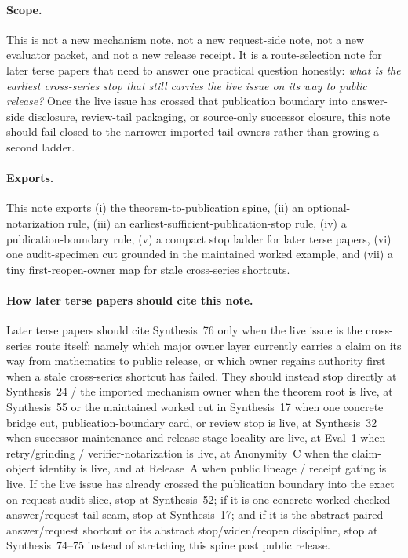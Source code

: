 \documentclass[11pt]{article}
\begin{document}
\paragraph{Scope.}
This is not a new mechanism note, not a new request-side note, not a new evaluator packet, and not a new release receipt.
It is a route-selection note for later terse papers that need to answer one practical question honestly: \emph{what is the earliest cross-series stop that still carries the live issue on its way to public release?} Once the live issue has crossed that publication boundary into answer-side disclosure, review-tail packaging, or source-only successor closure, this note should fail closed to the narrower imported tail owners rather than growing a second ladder.

\paragraph{Exports.}
This note exports (i) the theorem-to-publication spine, (ii) an optional-notarization rule, (iii) an earliest-sufficient-publication-stop rule, (iv) a publication-boundary rule, (v) a compact stop ladder for later terse papers, (vi) one audit-specimen cut grounded in the maintained worked example, and (vii) a tiny first-reopen-owner map for stale cross-series shortcuts.

\paragraph{How later terse papers should cite this note.}
Later terse papers should cite Synthesis~76 only when the live issue is the cross-series route itself: namely which major owner layer currently carries a claim on its way from mathematics to public release, or which owner regains authority first when a stale cross-series shortcut has failed. They should instead stop directly at Synthesis~24 / the imported mechanism owner when the theorem root is live, at Synthesis~55 or the maintained worked cut in Synthesis~17 when one concrete bridge cut, publication-boundary card, or review stop is live, at Synthesis~32 when successor maintenance and release-stage locality are live, at Eval~1 when retry/grinding / verifier-notarization is live, at Anonymity~C when the claim-object identity is live, and at Release~A when public lineage / receipt gating is live. If the live issue has already crossed the publication boundary into the exact on-request audit slice, stop at Synthesis~52; if it is one concrete worked checked-answer/request-tail seam, stop at Synthesis~17; and if it is the abstract paired answer/request shortcut or its abstract stop/widen/reopen discipline, stop at Synthesis~74--75 instead of stretching this spine past public release.\cite{series:mathcrosswalk,series:seriesspines,series:workedexample,series:releasespine,series:evalnotary,series:abomoinl,series:releaseproperty,series:challengeanswerdisclosurepackets,series:pairedterminalcitationdiscipline,series:pairedterminalcutoverrule}
\end{document}
